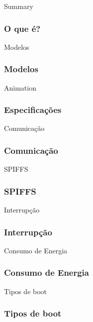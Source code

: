 \documentclass[10pt, compress]{beamer}
\begin{document}
\begin{frame}{Summary}
  \frametitle{O que é?}
\end{frame}

\begin{frame}{Modelos}
  \frametitle{Modelos}
\end{frame}

\begin{frame}{Animation}
  \frametitle{Especificações}
\end{frame}

\begin{frame}{Comunicação}
  \frametitle{Comunicação}
\end{frame}

\begin{frame}{SPIFFS}
  \frametitle{SPIFFS}
\end{frame}

\begin{frame}{Interrupção}
  \frametitle{Interrupção}
\end{frame}

\begin{frame}{Consumo de Energia}
  \frametitle{Consumo de Energia}
\end{frame}

\begin{frame}{Tipos de boot}
  \frametitle{Tipos de boot}
\end{frame}
\end{document}
